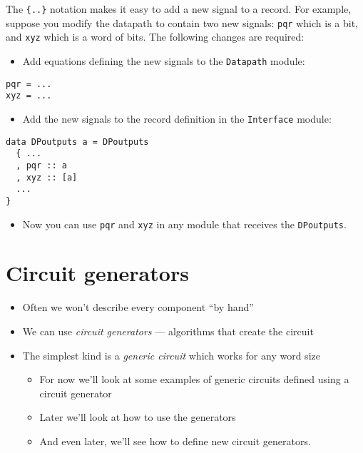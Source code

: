 \documentclass[11pt]{article}
\begin{document}
The \texttt{\{..\}} notation makes it easy to add a new signal to a record.
For example, suppose you modify the datapath to contain two new
signals: \texttt{pqr} which is a bit, and \texttt{xyz} which is a word of bits.
The following changes are required:
\begin{itemize}
\item Add equations defining the new signals to the \texttt{Datapath} module:
\end{itemize}
\begin{verbatim}
pqr = ...
xyz = ...
\end{verbatim}
\begin{itemize}
\item Add the new signals to the record definition in the \texttt{Interface}
module:
\end{itemize}
\begin{verbatim}
data DPoutputs a = DPoutputs
  { ...
  , pqr :: a
  , xyz :: [a]
  ...
}
\end{verbatim}
\begin{itemize}
\item Now you can use \texttt{pqr} and \texttt{xyz} in any module that receives the
\texttt{DPoutputs}.
\end{itemize}


\section{Circuit generators}
\label{sec:org8ea5338}

\begin{itemize}
\item Often we won't describe every component ``by hand''

\item We can use \emph{circuit generators} --- algorithms that
create the circuit

\item The simplest kind is a \emph{generic circuit} which works for
any word size

\begin{itemize}
\item For now we'll look at some examples of generic circuits
defined using a circuit generator

\item Later we'll look at how to use the generators

\item And even later, we'll see how to define new circuit
generators.
\end{itemize}
\end{itemize}
\end{document}
